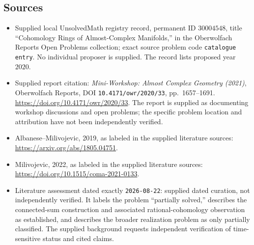 \documentclass[11pt]{article}
\begin{document}
\subsection{Sources}
\begin{itemize}
\item Supplied local UnsolvedMath registry record, permanent ID \(30004548\), title ``Cohomology Rings of Almost-Complex Manifolds,'' in the Oberwolfach Reports Open Problems collection; exact source problem code \texttt{catalogue entry}. No individual proposer is supplied. The record lists proposed year \(2020\).
\item Supplied report citation: \emph{Mini-Workshop: Almost Complex Geometry (2021)}, Oberwolfach Reports, DOI \texttt{10.4171/owr/2020/33}, pp.\ 1657--1691. \url{https://doi.org/10.4171/owr/2020/33}. The report is supplied as documenting workshop discussions and open problems; the specific problem location and attribution have not been independently verified.
\item Albanese--Milivojevic, 2019, as labeled in the supplied literature sources: \url{https://arxiv.org/abs/1805.04751}.
\item Milivojevic, 2022, as labeled in the supplied literature sources: \url{https://doi.org/10.1515/coma-2021-0133}.
\item Literature assessment dated exactly \texttt{2026-08-22}: supplied dated curation, not independently verified. It labels the problem ``partially solved,'' describes the connected-sum construction and associated rational-cohomology observation as established, and describes the broader realization problem as only partially classified. The supplied background requests independent verification of time-sensitive status and cited claims.
\end{itemize}
\end{document}

